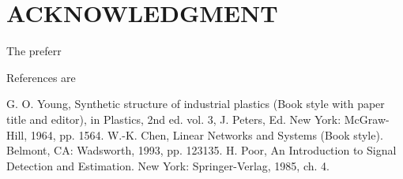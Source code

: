 \documentclass[letterpaper, 10 pt, conference]{ieeeconf}  %
\begin{document}
\section*{ACKNOWLEDGMENT}

The preferr




References are
\begin{thebibliography}{99}

 G. O. Young, Synthetic structure of industrial plastics (Book style with paper title and editor), 	in Plastics, 2nd ed. vol. 3, J. Peters, Ed.  New York: McGraw-Hill, 1964, pp. 1564.
 W.-K. Chen, Linear Networks and Systems (Book style).	Belmont, CA: Wadsworth, 1993, pp. 123135.
 H. Poor, An Introduction to Signal Detection and Estimation.   New York: Springer-Verlag, 1985, ch. 4.




\end{thebibliography}
\end{document}
